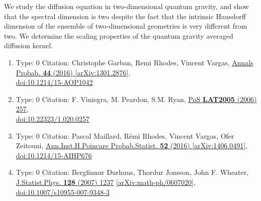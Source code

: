 \documentclass[a4paper,10pt]{article}
\begin{document}
\begin{enumerate}
We study the diffusion equation in two-dimensional quantum gravity, and show that the spectral dimension is two despite the fact that the intrinsic Hausdorff dimension of the ensemble of two-dimensional geometries is very different from two. We determine the scaling properties of the quantum gravity averaged diffusion kernel.
\begin{enumerate}
  \item Type: 0 Citation: Christophe Garban, Remi Rhodes, Vincent Vargas, \href{https://www.doi.org/10.1214/15-AOP1042}{Annals Probab. {\bf 44} (2016) }  \href{https://arxiv.org/abs/1301.2876}{[arXiv:1301.2876]},\\\href{https://www.doi.org/10.1214/15-AOP1042}{doi:10.1214/15-AOP1042}
  \item Type: 0 Citation: F. Viniegra, M. Peardon, S.M. Ryan, \href{https://www.doi.org/10.22323/1.020.0257}{PoS {\bf LAT2005} (2006) 257},\\\href{https://www.doi.org/10.22323/1.020.0257}{doi:10.22323/1.020.0257}
  \item Type: 0 Citation: Pascal Maillard, Rémi Rhodes, Vincent Vargas, Ofer Zeitouni, \href{https://www.doi.org/10.1214/15-AIHP676}{Ann.Inst.H.Poincare Probab.Statist. {\bf 52} (2016) }  \href{https://arxiv.org/abs/1406.0491}{[arXiv:1406.0491]},\\\href{https://www.doi.org/10.1214/15-AIHP676}{doi:10.1214/15-AIHP676}
  \item Type: 0 Citation: Bergfinnur Durhuus, Thordur Jonsson, John F. Wheater, \href{https://www.doi.org/10.1007/s10955-007-9348-3}{J.Statist.Phys. {\bf 128} (2007) 1237}  \href{https://arxiv.org/abs/math-ph/0607020}{[arXiv:math-ph/0607020]},\\\href{https://www.doi.org/10.1007/s10955-007-9348-3}{doi:10.1007/s10955-007-9348-3}

\end{enumerate}
\end{enumerate}
\end{document}

